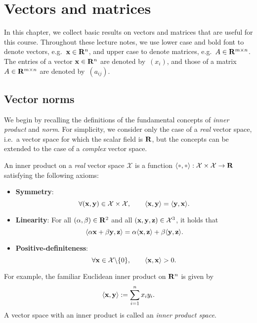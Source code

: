 \setlength{\OuterFrameSep}{0pt}

\chapter{Vectors and matrices}%
\label{cha:vectors_and_matrices}

In this chapter,
we collect basic results on vectors and matrices that are useful for this course.
Throughout these lecture notes,
we use lower case and bold font to denote vectors, e.g.\ $\mathbf x \in \mathbf R^n$,
and upper case to denote matrices, e.g.\ $A \in \mathbf R^{m \times n}$.
The entries of a vector $\mathbf x \in \mathbf R^n$ are denoted by~$(x_i)$,
and those of a matrix $A \in \mathbf R^{m \times n}$ are denoted by~$(a_{ij})$.


\section{Vector norms}%
\label{sub:vector_norms}

We begin by recalling the definitions of the fundamental concepts of \emph{inner product} and \emph{norm}.
For simplicity,
we consider only the case of a \emph{real} vector space,
i.e.\ a vector space for which the scalar field is $\mathbf R$,
but the concepts can be extended to the case of a \emph{complex} vector space.
\begin{definition}
    An inner product on a \emph{real} vector space $\mathcal X$ is a function $\ip{\placeholder,\placeholder}: \mathcal X \times \mathcal X \to \real$ satisfying the following axioms:
    \begin{itemize}
        \item
            \textbf{Symmetry}:
            \[
                \forall (\mathbf x, \mathbf y) \in \mathcal X \times \mathcal X, \qquad
                \langle\mathbf x, \mathbf y\rangle = \langle\mathbf y, \mathbf x\rangle.
            \]

        \item
            \textbf{Linearity}:
            For all $(\alpha, \beta) \in \mathbf R^2$ and all $(\mathbf x, \mathbf y, \mathbf z) \in \mathcal X^3$,
            it holds that
            \[
                \langle\alpha \mathbf x + \beta \mathbf y, \mathbf z\rangle
                = \alpha \langle\mathbf x, \mathbf z\rangle + \beta \langle\mathbf y, \mathbf z\rangle.
            \]

        \item
            \textbf{Positive-definiteness}:
            \[
                \forall \mathbf x \in \mathcal X \backslash \{0\}, \qquad
                \langle\mathbf x, \mathbf x\rangle > 0.
            \]
    \end{itemize}
\end{definition}
For example, the familiar Euclidean inner product on $\mathbf R^n$ is given by
\[
    \langle\mathbf x, \mathbf y\rangle := \sum_{i=1}^{n} x_i y_i.
\]
A vector space with an inner product is called an \emph{inner product space}.

